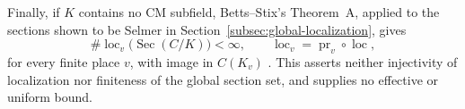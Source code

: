Finally, if $K$ contains no CM subfield, Betts--Stix's Theorem~A,
applied to the sections shown to be Selmer in
Section~\ref{subsec:global-localization}, gives
\[
 \#\operatorname{loc}_v\bigl(\operatorname{Sec}(C/K)\bigr)<\infty,
 \qquad
 \operatorname{loc}_v=\operatorname{pr}_v\circ\operatorname{loc},
\]
for every finite place $v$, with image in $C(K_v)$
\cite[arXiv version, Definition~1.1 and Theorem~A]{BettsStix}.
This asserts neither injectivity of localization nor finiteness of the
global section set, and supplies no effective or uniform bound.
